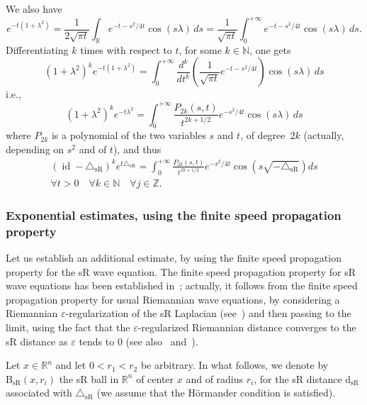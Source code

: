\documentclass[AHL,Unicode,published]{cedram}
\newcommand*\R{\mathbb{R}}
\newcommand*\N{\mathbb{N}}
\newcommand*\Z{\mathbb{Z}}
\DeclareMathOperator{\id}{id}
\newcommand{\trianglesR}{\triangle_{\mathrm{sR}}}
\newcommand{\dsR}{\mathrm{d}_{\mathrm{sR}}}
\newcommand{\BsR}{\mathrm{B}_{\mathrm{sR}}}
\let\oldforall\forall
\renewcommand*{\forall}{\mathrel{\oldforall}}
\begin{document}
We also have
\[
e^{-t\left(1+\lambda^2\right)} = \frac{1}{2\sqrt{\pi t}} \int_\R e^{-t-s^2/4t} \cos(s\lambda)\, ds = \frac{1}{\sqrt{\pi t}} \int_0^{+\infty} e^{-t-s^2/4t} \cos(s\lambda)\, ds.
\]
Differentiating $k$ times with respect to $t$, for some $k\in\N$, one gets
\[
\left(1+\lambda^2\right)^ke^{-t(1+\lambda^2)} = \int_0^{+\infty} \frac{d^k}{dt^k}\left(\frac{1}{\sqrt{\pi t}} e^{-t-s^2/4t}\right) \cos(s\lambda)\, ds
\]
i.e.,
\[
\left(1+\lambda^2\right)^ke^{-t\lambda^2} = \int_0^{+\infty} \frac{P_{2k}(s,t)}{t^{2k+1/2}} e^{-s^2/4t} \cos(s\lambda)\, ds
\]
where $P_{2k}$ is a polynomial of the two variables $s$ and $t$, of degree~$2k$ (actually, depending on $s^2$ and of $t$), and thus
\begin{multline}\label{fourierjk}
\left(\id-\trianglesR\right)^ke^{t\trianglesR} = \int_0^{+\infty} \frac{P_{2k}(s,t)}{t^{2k+1/2}} e^{-s^2/4t} \cos\left(s\sqrt{-\trianglesR}\right) ds \\
\forall t>0\quad \forall k\in\N\quad\forall j\in\Z.
\end{multline}



\subsubsection{Exponential estimates, using the finite speed propagation property}
Let us establish an additional estimate, by using the finite speed propagation property for the sR wave equation. The finite speed propagation property for sR wave equations has been established in~\cite{Me-84}; actually, it follows from the finite speed propagation property for usual Riemannian wave equations, by considering a Riemannian $\varepsilon$-regularization of the sR Laplacian (see~\cite{Ge}) and then passing to the limit, using the fact that the $\varepsilon$-regularized Riemannian distance converges to the sR distance as $\varepsilon$ tends to $0$ (see also~\cite[Section~1.4.D]{Gromov} and~\cite[Appendix A4]{Varopoulos}).

Let $x\in\R^n$ and let $0<r_1<r_2$ be arbitrary. In what follows, we denote by $\BsR(x,r_i)$ the sR ball in $\R^n$ of center $x$ and of radius $r_i$, for the sR distance $\dsR$ associated with $\trianglesR$ (we assume that the H\"ormander condition is satisfied).
\end{document}
